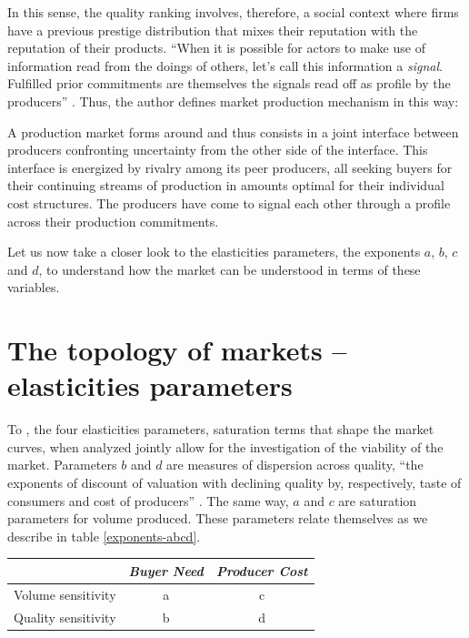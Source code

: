 \documentclass[a4paper, 12pt, openright, oneside, german, french, brazil, english]{abntex2}
\begin{document}
	In this sense, the quality ranking involves, therefore, a social context where firms have a previous prestige distribution that mixes their reputation with the reputation of their products. ``When it is possible for actors to make use of information read from the doings of others, let's call this information a \textit{signal}. Fulfilled prior commitments are themselves the signals read off as profile by the producers'' \cite[p. 16]{white2002markets}. Thus, the author defines market production mechanism in this way:
	
	\begin{citacao}
		A production market forms around and thus consists in a joint interface between producers confronting uncertainty from the other side of the interface. This interface is energized by rivalry among its peer producers, all seeking buyers for their continuing streams of production in amounts optimal for their individual cost structures. The producers have come to signal each other through a profile across their production commitments. \cite[p. 27]{white2002markets}
	\end{citacao}
	
	Let us now take a closer look to the elasticities parameters, the exponents $a$, $b$, $c$ and $d$, to understand how the market can be understood in terms of these variables.
	
	\section{The topology of markets -- elasticities parameters}
	
	To , the four elasticities parameters, saturation terms that shape the market curves, when analyzed jointly allow for the investigation of the viability of the market. Parameters $b$ and $d$ are measures of dispersion across quality, ``the exponents of discount of valuation with declining quality by, respectively, taste of consumers and cost of producers'' \cite[p. 50]{white2002markets}. The same way, $a$ and $c$ are saturation parameters for volume produced. These parameters relate themselves as we describe in table \ref{exponents-abcd}.
	
	\begin{table}[ht]
	{\begin{tabular}{l c c}
			\hline
			\hline
			   					& \textit{Buyer Need} & \textit{Producer Cost} \\
			\hline
			Volume sensitivity	& a					  & c						\\
			Quality sensitivity	& b					  & d						\\
			\hline			
		\end{tabular}
	}
	{}
	\end{table}
		
\end{document}
